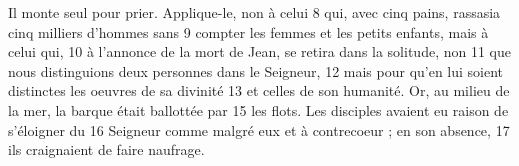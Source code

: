 Il monte seul pour prier. Applique-le, non à celui	 
8	 	qui, avec cinq pains, rassasia cinq milliers d'hommes sans	 
9	 	compter les femmes et les petits enfants, mais à celui qui,	 
10	 	à l'annonce de la mort de Jean, se retira dans la solitude, non	 
11	 	que nous distinguions deux personnes dans le Seigneur,	 
12	 	mais pour qu'en lui soient distinctes les oeuvres de sa divinité	 
13	 	et celles de son humanité.
Or, au milieu de la mer, la barque était ballottée par	 
15	 	les flots. Les disciples avaient eu raison de s'éloigner du	 
16	 	Seigneur comme malgré eux et à contrecoeur ; en son absence,	 
17	 	ils craignaient de faire naufrage.